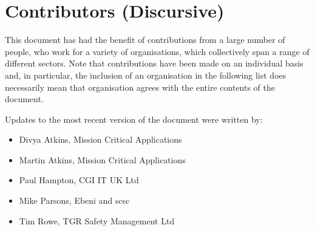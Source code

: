 %
%
\chapter{Contributors (Discursive)} \label{bkm:contributors}


This document has had the benefit of contributions from a large number of people, who work for a variety of organisations, which collectively span a range of different sectors. Note that contributions  have been made on an individual basis and, in particular, the inclusion of an organisation in the following list does  necessarily mean that organisation agrees with the entire contents of the document.

Updates to the most recent version of the document were written by:
\begin{itemize}
  \item Divya Atkins, Mission Critical Applications
  \item Martin Atkins, Mission Critical Applications
  \item Paul Hampton, CGI IT UK Ltd
  \item Mike Parsons, Ebeni and \gls{scsc}
  \item Tim Rowe, TGR Safety Management Ltd
\end{itemize}

  
